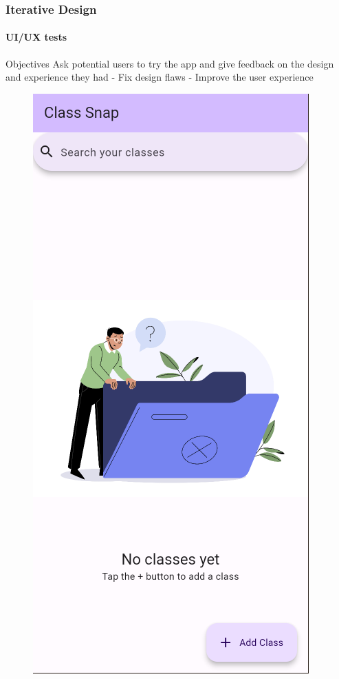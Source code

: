 \documentclass{beamer}
\begin{document}
	\begin{frame}
		\frametitle{Iterative Design}
		\framesubtitle{UI/UX tests}
		\begin{alertblock}{Objectives}
			Ask potential users to try the app and give feedback on the design and experience they had
			\linebreak
			- Fix design flaws
			\linebreak
			- Improve the user experience
		\end{alertblock}
	
		\begin{figure}
			\centering
			\begin{minipage}{0.16\textwidth}
				\includegraphics[width=\linewidth]{list_empty_fixed}

\end{minipage}
\end{figure}
\end{frame}
\end{document}
